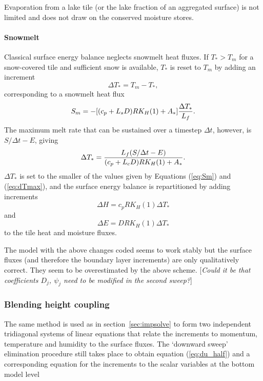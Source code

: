 \documentclass{UMDP_article}
\begin{document}
Evaporation from a lake tile (or the lake fraction of an aggregated
surface) is not limited and does not draw on the conserved moisture
stores.

\paragraph{Snowmelt}

Classical surface energy balance neglects snowmelt heat fluxes.  If
$T_*>T_m$ for a snow-covered tile and sufficient snow is available,
$T_*$ is reset to $T_m$ by adding an increment
\begin{equation}
  \Delta T_*=T_m-T_*,
\end{equation}
corresponding to a snowmelt heat flux
\begin{equation}
  S_m = - [(c_p + L_sD)RK_H(1) + A_*]{\Delta T_*\over L_f}.
  \label{eq:Sm}
\end{equation}
The maximum melt rate that can be sustained over a timestep $\Delta
t$, however, is $S/\Delta t-E$, giving
\begin{equation}
  \Delta T_*={L_f(S/\Delta t-E) \over
             (c_p+L_cD)RK_H(1) + A_*}.
  \label{eq:dTmax}
\end{equation}
$\Delta T_*$ is set to the smaller of the values given by Equations
(\ref{eq:Sm}) and (\ref{eq:dTmax}), and the surface energy balance is
repartitioned by adding increments
\begin{equation}
  \Delta H = c_pRK_H(1)\Delta T_*
\end{equation}
and
\begin{equation}
  \Delta E = DRK_H(1)\Delta T_*
\end{equation}
to the tile heat and moisture fluxes.

The model with the above changes coded seems to work stably but the
surface fluxes (and therefore the boundary layer increments) are only
qualitatively correct. They seem to be overestimated by the above
scheme. {[}\textit{Could it be that coefficients $D_{j}$, $\psi_{j}$
  need to be modified in the second sweep?}]

\subsubsection{Blending height coupling}

The same method is used as in section~\ref{sec:impsolve} to form two 
independent tridiagonal systems of linear equations that relate the
increments to momentum, temperature and humidity to the surface fluxes.
The `downward sweep' elimination procedure still takes place to obtain
equation (\ref{eq:du_half}) and a corresponding equation for the 
increments to the scalar variables at the bottom model level
\end{document}

